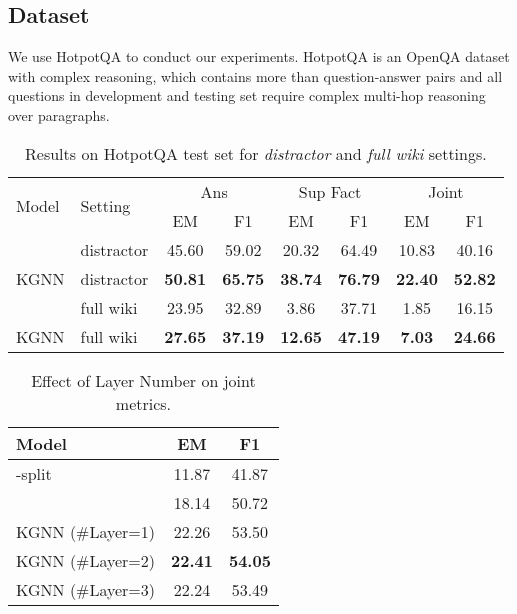 \documentclass[11pt,a4paper]{article}
\begin{document}
\subsection{Dataset}
We use HotpotQA to conduct our experiments. HotpotQA is an OpenQA dataset with complex reasoning, which contains more than  question-answer pairs and all questions in development and testing set require complex multi-hop reasoning over paragraphs.
\begin{table*}
\centering
\small

\begin{tabular}{l |l|c c |c c| c c}
\toprule

\multirow{2}{*}{Model}  & \multirow{2}{*}{Setting}  &\multicolumn{2}{c|}{Ans}   &  \multicolumn{2}{c|}{Sup Fact}    & \multicolumn{2}{c}{Joint} \\
                        &                           & EM        & F1            & EM        & F1                    & EM        & F1\\
\midrule
\citet{yang2018hotpotqa} & distractor                & 45.60     & 59.02         & 20.32     & 64.49                 & 10.83     &40.16 \\
KGNN           & distractor                &\bf{50.81} &\bf{65.75}     & \bf{38.74}& \bf{76.79}            & \bf{22.40}& \bf{52.82}\\
\midrule
\citet{yang2018hotpotqa} & full wiki                  & 23.95     & 32.89         & 3.86      &37.71                  & 1.85      & 16.15\\
KGNN           & full wiki                  &\bf{27.65} &\bf{37.19}     & \bf{12.65}& \bf{47.19}            & \bf{7.03} &\bf{24.66}\\

\bottomrule
\end{tabular}
\caption{Results on HotpotQA test set for \emph{distractor} and \emph{full wiki} settings.}
\label{tab:overall_result}
\end{table*}



\begin{table}
\centering
\small

\begin{tabular}{l|c c }
\toprule
Model             & EM        & F1\\
\midrule
\citet{yang2018hotpotqa}-split      & 11.87     & 41.87\\
\citet{yang2018hotpotqa}      & 18.14     & 50.72\\
KGNN (\#Layer=1)                    & 22.26     & 53.50\\
KGNN (\#Layer=2)                    &\textbf{22.41}& \textbf{54.05}\\
KGNN (\#Layer=3)                    & 22.24     & 53.49\\
\bottomrule
\end{tabular}
\caption{Effect of Layer Number on joint metrics.}
\label{tab:layer_number}
\end{table}
\end{document}
